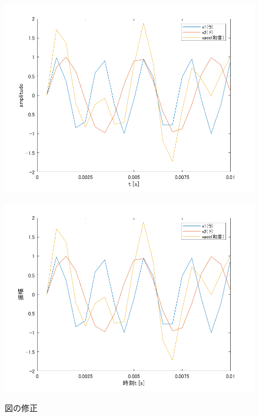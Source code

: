\documentclass[11pt, a4paper, titlepage]{ltjsarticle}
\begin{document}
\begin{figure}[h]
    \begin{center}
    \begin{minipage}[t]{0.48\columnwidth}
        \includegraphics[width=\columnwidth]{figures/2-1.png}
        \label{fign:2-1}  
    \end{minipage}
    \begin{minipage}[t]{0.48\columnwidth}
        \includegraphics[width=\columnwidth]{figures/2-1-syusei.png}
        \label{fign:2-1s}
    \end{minipage}
    \end{center}
    \caption{図の修正}
    \end{figure}
\newpage
\end{document}
